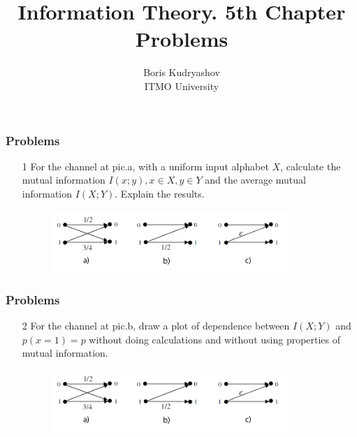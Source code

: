 \documentclass[14pt]{beamer}
\title{\small{Information Theory. 5th Chapter Problems}}
\author{\huge{
Boris Kudryashov \\
\vspace{30pt}
ITMO University
}}
\begin{document}
\maketitle

 
    
\begin{frame}
\frametitle{Problems}
\begin{enumerate}
    \item[1]
    For the channel at pic.a, with a uniform input alphabet $X$, calculate the mutual information $I\left( {x;y} \right),x \in X,y \in Y$ and the average mutual information $I\left( {X;Y} \right)$. Explain the results.
    
    \begin{figure}[ht]
    \begin{minipage}{1.0\linewidth}
    \includegraphics[width=0.85\textwidth]{fig5p_1.png}
    \label{chan_ex}
    \end{minipage}
    \end{figure}
    
\end{enumerate}
\end{frame}    
    
\begin{frame}
\frametitle{Problems}
\begin{enumerate}    
    
    \item[2]
    For the channel at pic.b, draw a plot of dependence between $I\left( {X;Y} \right)$ and  $p\left( {x = 1}
    \right) = p$ without doing calculations and without using properties of mutual information.
    
    
    \begin{figure}[ht]
    \begin{minipage}{1.0\linewidth}
    \includegraphics[width=0.85\textwidth]{fig5p_1.png}
    \label{chan_ex}
    \end{minipage}
    \end{figure}
 
\end{enumerate}
\end{frame}    
    
\end{document}
